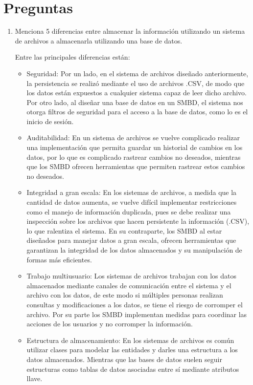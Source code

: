 \newpage
\section{Preguntas}

\begin{enumerate}
    \item Menciona 5 diferencias entre almacenar la información utilizando un sistema de archivos a almacenarla utilizando una base de datos.
    
    Entre las principales diferencias están:
    \begin{itemize}
        \item Seguridad: Por un lado, en el sistema de archivos diseñado anteriormente, la persistencia se realizó mediante el uso de archivos .CSV, de modo que los datos están expuestos a cualquier sistema capaz de leer dicho archivo. Por otro lado, al diseñar una base de datos en un SMBD, el sistema nos otorga filtros de seguridad para el acceso a la base de datos, como lo es el inicio de sesión.
        \item Auditabilidad: En un sistema de archivos se vuelve complicado realizar una implementación que permita guardar un historial de cambios en los datos, por lo que es complicado rastrear cambios no deseados, mientras que los SMBD ofrecen herramientas que permiten rastrear estos cambios no deseados.
        \item Integridad a gran escala: En los sistemas de archivos, a medida que la cantidad de datos aumenta, se vuelve difícil implementar restricciones como el manejo de información duplicada, pues se debe realizar una inspección sobre los archivos que hacen persistente la información (.CSV), lo que ralentiza el sistema. En su contraparte, los SMBD al estar diseñados para manejar datos a gran escala, ofrecen herramientas que garantizan la integridad de los datos almacenados y su manipulación de formas más eficientes.
        \item Trabajo multiusuario: Los sistemas de archivos trabajan con los datos almacenados mediante canales de comunicación entre el sistema y el archivo con los datos, de este modo si múltiples personas realizan consultas y modificaciones a los datos, se tiene el riesgo de corromper el archivo. Por su parte los SMBD implementan medidas para coordinar las acciones de los usuarios y no corromper la información.
        \item Estructura de almacenamiento: En los sistemas de archivos es común utilizar clases para modelar las entidades y darles una estructura a los datos almacenados. Mientras que las bases de datos suelen seguir estructuras como tablas de datos asociadas entre sí mediante atributos llave.
    \end{itemize}


\end{enumerate}
